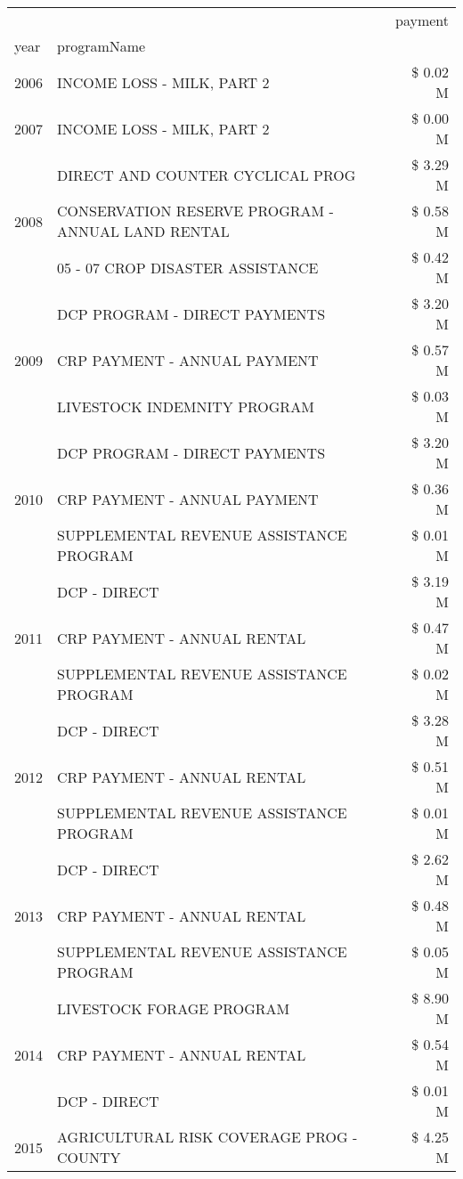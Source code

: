 \begin{tabular}{llr}
\toprule
 &  & payment \\
year & programName &  \\
\midrule
2006 & INCOME LOSS - MILK, PART 2 & \$ 0.02 M \\
\cline{1-3}
2007 & INCOME LOSS - MILK, PART 2 & \$ 0.00 M \\
\cline{1-3}
\multirow[t]{3}{*}{2008} & DIRECT AND COUNTER CYCLICAL PROG & \$ 3.29 M \\
 & CONSERVATION RESERVE PROGRAM - ANNUAL LAND RENTAL & \$ 0.58 M \\
 & 05 - 07 CROP DISASTER ASSISTANCE & \$ 0.42 M \\
\cline{1-3}
\multirow[t]{3}{*}{2009} & DCP PROGRAM - DIRECT PAYMENTS & \$ 3.20 M \\
 & CRP PAYMENT - ANNUAL PAYMENT & \$ 0.57 M \\
 & LIVESTOCK INDEMNITY PROGRAM & \$ 0.03 M \\
\cline{1-3}
\multirow[t]{3}{*}{2010} & DCP PROGRAM - DIRECT PAYMENTS & \$ 3.20 M \\
 & CRP PAYMENT - ANNUAL PAYMENT & \$ 0.36 M \\
 & SUPPLEMENTAL REVENUE ASSISTANCE PROGRAM & \$ 0.01 M \\
\cline{1-3}
\multirow[t]{3}{*}{2011} & DCP - DIRECT & \$ 3.19 M \\
 & CRP PAYMENT - ANNUAL RENTAL & \$ 0.47 M \\
 & SUPPLEMENTAL REVENUE ASSISTANCE PROGRAM & \$ 0.02 M \\
\cline{1-3}
\multirow[t]{3}{*}{2012} & DCP - DIRECT & \$ 3.28 M \\
 & CRP PAYMENT - ANNUAL RENTAL & \$ 0.51 M \\
 & SUPPLEMENTAL REVENUE ASSISTANCE PROGRAM & \$ 0.01 M \\
\cline{1-3}
\multirow[t]{3}{*}{2013} & DCP - DIRECT & \$ 2.62 M \\
 & CRP PAYMENT - ANNUAL RENTAL & \$ 0.48 M \\
 & SUPPLEMENTAL REVENUE ASSISTANCE PROGRAM & \$ 0.05 M \\
\cline{1-3}
\multirow[t]{3}{*}{2014} & LIVESTOCK FORAGE PROGRAM & \$ 8.90 M \\
 & CRP PAYMENT - ANNUAL RENTAL & \$ 0.54 M \\
 & DCP - DIRECT & \$ 0.01 M \\
\cline{1-3}
\multirow[t]{3}{*}{2015} & AGRICULTURAL RISK COVERAGE PROG - COUNTY & \$ 4.25 M \\

\end{tabular}
